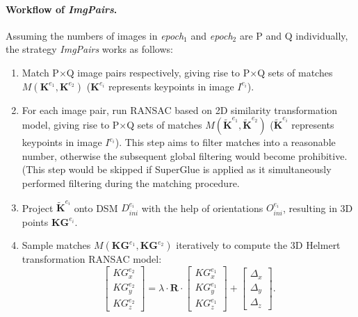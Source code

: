 \paragraph{Workflow of \textit{ImgPairs}.} Assuming the numbers of images in \textit{epoch$_1$} and \textit{epoch$_2$} are P and Q individually, the strategy \textit{ImgPairs} works as follows:\\
\begin{enumerate}
    \item Match P$\times$Q image pairs respectively, giving rise to P$\times$Q sets of matches $M({\mathbf{K}^{e_1},\mathbf{K}^{e_2}})$ ($\mathbf{K}^{e_i}$ represents keypoints in image $I^{e_i}$).
    \item For each image pair, run RANSAC based on 2D similarity transformation model, giving rise to P$\times$Q sets of matches $M({\mathbf{\widetilde{K}}^{e_1},\mathbf{\widetilde{K}}^{e_2}})$ ($\mathbf{\widetilde{K}}^{e_i}$ represents keypoints in image $I^{e_i}$). This step aims to filter matches into a reasonable number, otherwise the subsequent global filtering would become prohibitive. (This step would be skipped if SuperGlue is applied as it simultaneously performed filtering during the matching procedure. %
    \item Project $\mathbf{\widetilde{K}}^{e_i}$ onto DSM $D_{ini}^{e_i}$ with the help of orientations $O_{ini}^{e_i}$, resulting in 3D points $\mathbf{KG}^{e_i}$.
    \item Sample matches $M({\mathbf{KG}^{e_1},\mathbf{KG}^{e_2}})$ iteratively to compute the 3D Helmert transformation RANSAC model:
\begin{equation}
\left [ \begin{array}{c}
{KG}_x^{e_2}\\
{KG}_y^{e_2}\\
{KG}_z^{e_2}
\end{array}
\right ] =\lambda \cdot \mathbf{R} \cdot {\left [ \begin{array}{c}
    {KG}_x^{e_1}\\
    {KG}_y^{e_1}\\
    {KG}_z^{e_1}
    \end{array}
    \right ]} + \left [ \begin{array}{c}
\Delta_x\\
\Delta_y\\
\Delta_z
\end{array}
\right ]. \label{eq:2DSim}
\end{equation}
    

\end{enumerate}
